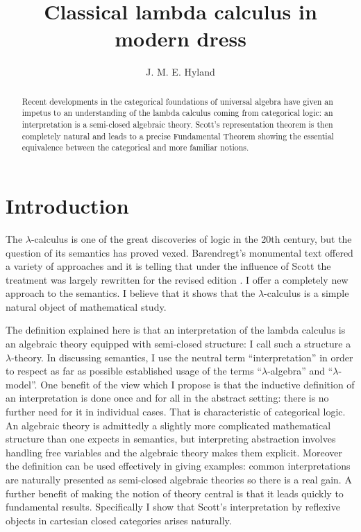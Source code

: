 \documentclass[12pt, amstex, amssymb]{article}
\title{Classical lambda calculus in modern dress}
\author{J. M. E. Hyland}
\begin{document}
\maketitle
\begin{abstract}
Recent developments in the categorical foundations of
universal algebra have given an impetus to an 
understanding of the lambda calculus coming from 
categorical logic: an interpretation is a semi-closed 
algebraic theory. Scott's representation 
theorem is then completely natural and leads to a
precise Fundamental Theorem showing the essential equivalence 
between the categorical and more familiar notions. 
\end{abstract}
\section{Introduction}

The $\lambda$-calculus is one of the great discoveries of logic
in the 20th century, but the question of its semantics has proved
vexed. Barendregt's monumental text \cite{Bar81} offered a variety
of approaches and it is telling that under the influence of Scott
\cite{Scott80} the treatment was largely rewritten
for the revised edition \cite{Bar84}. I offer a completely
new approach to the semantics. I believe that it shows that
the $\lambda$-calculus is a simple natural object of 
mathematical study.

The definition explained here is that an 
interpretation
of the lambda calculus is an algebraic theory equipped
with semi-closed structure: I call such a structure
a $\lambda$-theory. In discussing semantics,
I use the neutral
term ``interpretation'' in order to respect as
far as possible established usage of the
terms ``$\lambda$-algebra''
and ``$\lambda$-model''. One benefit of the view which I propose 
is that the inductive definition of an interpretation is done 
once and for all in the abstract setting: there is no further need
for it in individual cases. That is characteristic of categorical logic.
An algebraic theory is admittedly a slightly 
more complicated mathematical structure than one expects
in semantics, but interpreting abstraction involves
handling free variables and the algebraic theory makes them
explicit. Moreover the definition can be used effectively
in giving examples: common interpretations are naturally
presented as semi-closed algebraic theories so there is 
a real gain. A further benefit of
making the notion of theory central is that it leads quickly 
to fundamental results.
Specifically I show that Scott's interpretation
by reflexive objects in cartesian closed categories
arises naturally.
\end{document}
